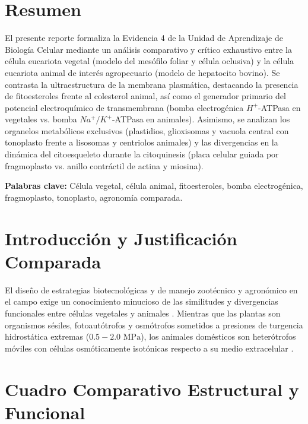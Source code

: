 \documentclass[12pt,spanish,letterpaper,oneside]{article}
\begin{document}
\hypersetup{pageanchor=false}
\begingroup
\fontsize{14}{17}\selectfont
\renewcommand{\Huge}{\fontsize{14}{17}\selectfont\bfseries}
\renewcommand{\large}{\fontsize{14}{17}\selectfont}
\templatePortrait
\clearpage
\endgroup
\hypersetup{pageanchor=true}
\templatePagecfg
\singlespacing
\setlength{\tabcolsep}{8pt}
\renewcommand{\arraystretch}{1.18}

\section*{Resumen}
El presente reporte formaliza la Evidencia 4 de la Unidad de Aprendizaje de Biología Celular mediante un análisis comparativo y crítico exhaustivo entre la célula eucariota vegetal (modelo del mesófilo foliar y célula oclusiva) y la célula eucariota animal de interés agropecuario (modelo de hepatocito bovino). Se contrasta la ultraestructura de la membrana plasmática, destacando la presencia de fitoesteroles frente al colesterol animal, así como el generador primario del potencial electroquímico de transmembrana (bomba electrogénica $H^+$-ATPasa en vegetales vs. bomba $Na^+/K^+$-ATPasa en animales). Asimismo, se analizan los organelos metabólicos exclusivos (plastidios, glioxisomas y vacuola central con tonoplasto frente a lisosomas y centriolos animales) y las divergencias en la dinámica del citoesqueleto durante la citoquinesis (placa celular guiada por fragmoplasto vs. anillo contráctil de actina y miosina).

\vspace{0.4cm}
\noindent\textbf{Palabras clave:} Célula vegetal, célula animal, fitoesteroles, bomba electrogénica, fragmoplasto, tonoplasto, agronomía comparada.

\section{Introducción y Justificación Comparada}
El diseño de estrategias biotecnológicas y de manejo zootécnico y agronómico en el campo exige un conocimiento minucioso de las similitudes y divergencias funcionales entre células vegetales y animales \parencite{alberts2015}. Mientras que las plantas son organismos sésiles, fotoautótrofos y osmótrofos sometidos a presiones de turgencia hidrostática extremas ($0.5-2.0\text{ MPa}$), los animales domésticos son heterótrofos móviles con células osmóticamente isotónicas respecto a su medio extracelular \parencite{taiz2015, lodish2016}.

\section{Cuadro Comparativo Estructural y Funcional}
\end{document}
